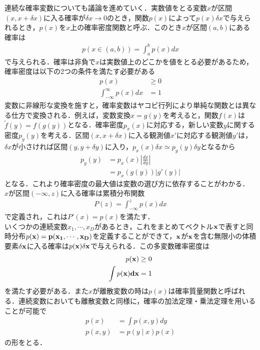 \documentclass[a4j,11pt]{article}
\begin{document}
\subsubsection{}
連続な確率変数についても議論を進めていく．実数値をとる変数$x$が区間$(x,x+\delta x)$に入る確率が$\delta x \to 0$のとき，関数$p(x)$によって$p(x)\delta x$で与えられるとき，$p(x)$を$x$上の確率密度関数と呼ぶ．このとき$x$が区間$(a,b)$にある確率は
\begin{align}
p(x\in(a,b)) = \int_a^b p(x)dx
\end{align}
で与えられる．確率は非負で$x$は実数値上のどこかを値をとる必要があるため，確率密度は以下の2つの条件を満たす必要がある
\begin{align}
p(x)&\geq 0\\
\int_{-\infty}^{\infty}p(x)dx &= 1
\end{align}
変数に非線形な変換を施すと，確率変数はヤコビ行列により単純な関数とは異なる仕方で変換される．例えば，変数変換$x = g(y)$を考えると，関数$f(x)$は$\tilde f(y) = f(g(y))$となる．確率密度$p_x(x)$に対応する，新しい変数$y$に関する密度$p_y(y)$を考える．区間$(x,x+ \delta x)$に入る観測値$x'$に対応する観測値$y'$は，$\delta x$が小さければ区間$(y,y + \delta y)$に入り，$p_x(x)\delta x\simeq p_y(y)\delta y$となるから
\begin{equation}
\begin{split}
p_y(y) &= p_x(x)\left|\frac{dx}{dy}\right|\\
&=p_x(g(y))|g'(y)|
\end{split}
\end{equation}
となる．これより確率密度の最大値は変数の選び方に依存することがわかる．\\

$x$が区間$(-\infty,z)$に入る確率は累積分布関数
\begin{align}
P(z) = \int_{-\infty}^zp(x)dx
\end{align}
で定義され，これは$P'(x) = p(x)$を満たす．\\
いくつかの連続変数$x_1,\cdots,x_D$があるとき，これをまとめてベクトル$\bf x$で表すと同時分布$p(\bf x) = p(x_1,\cdots,x_D)$を定義することができて，$\bf x$が$\bf x$を含む無限小の体積要素$\delta \bf x$に入る確率は$p(\bf x)\delta \bf x$で与えられる．この多変数確率密度は
\begin{align}
p(\bf x) & \geq 0\\
\int p(\bf x)d {\bf x} &= 1
\end{align}
を満たす必要がある．また$x$が離散変数の時は$p(x)$は確率質量関数と呼ばれる．連続変数においても離散変数と同様に，確率の加法定理・乗法定理を用いることが可能で
\begin{align}
p(x) &= \int p(x,y) dy\\
p(x,y) &= p(y\mid x)p(x)
\end{align}
の形をとる．\\
\end{document}
